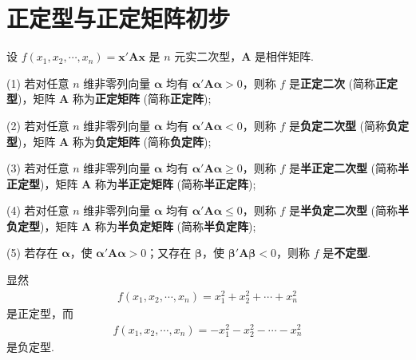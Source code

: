 \documentclass[../../main.tex]{subfiles}
\begin{document}
\section{正定型与正定矩阵初步}

\begin{definition}
设 $f(x_1,x_2,\cdots,x_n)=\boldsymbol{x}'\boldsymbol{A}\boldsymbol{x}$ 是 $n$ 元实二次型，$\boldsymbol{A}$ 是相伴矩阵.

(1) 若对任意 $n$ 维非零列向量 $\boldsymbol{\alpha}$ 均有 $\boldsymbol{\alpha}'\boldsymbol{A}\boldsymbol{\alpha}>0$，则称 $f$ 是\textbf{正定二次} (简称\textbf{正定型})，矩阵 $\boldsymbol{A}$ 称为\textbf{正定矩阵} (简称\textbf{正定阵});

(2) 若对任意 $n$ 维非零列向量 $\boldsymbol{\alpha}$ 均有 $\boldsymbol{\alpha}'\boldsymbol{A}\boldsymbol{\alpha}<0$，则称 $f$ 是\textbf{负定二次型} (简称\textbf{负定型})，矩阵 $\boldsymbol{A}$ 称为\textbf{负定矩阵} (简称\textbf{负定阵});

(3) 若对任意 $n$ 维非零列向量 $\boldsymbol{\alpha}$ 均有 $\boldsymbol{\alpha}'\boldsymbol{A}\boldsymbol{\alpha}\geqslant 0$，则称 $f$ 是\textbf{半正定二次型} (简称\textbf{半正定型})，矩阵 $\boldsymbol{A}$ 称为\textbf{半正定矩阵} (简称\textbf{半正定阵});

(4) 若对任意 $n$ 维非零列向量 $\boldsymbol{\alpha}$ 均有 $\boldsymbol{\alpha}'\boldsymbol{A}\boldsymbol{\alpha}\leqslant 0$，则称 $f$ 是\textbf{半负定二次型} (简称\textbf{半负定型})，矩阵 $\boldsymbol{A}$ 称为\textbf{半负定矩阵} (简称\textbf{半负定阵});

(5) 若存在 $\boldsymbol{\alpha}$，使 $\boldsymbol{\alpha}'\boldsymbol{A}\boldsymbol{\alpha}>0$；又存在 $\boldsymbol{\beta}$，使 $\boldsymbol{\beta}'\boldsymbol{A}\boldsymbol{\beta}<0$，则称 $f$ 是\textbf{不定型}.
\end{definition}
\begin{remark}
显然
\begin{align*}
f(x_1,x_2,\cdots,x_n)=x_1^2 + x_2^2 + \cdots + x_n^2
\end{align*}
是正定型，而
\begin{align*}
f(x_1,x_2,\cdots,x_n)=-x_1^2 - x_2^2 - \cdots - x_n^2
\end{align*}
是负定型. 
\end{remark}
\end{document}
